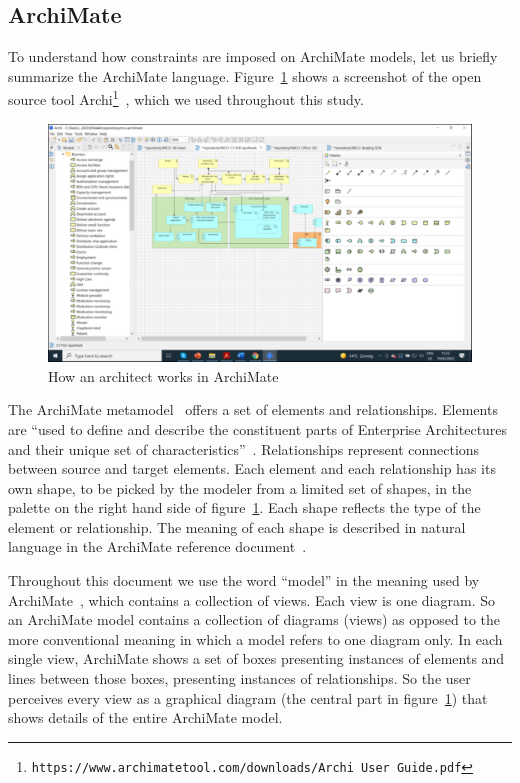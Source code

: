 \documentclass[sn-vancouver]{sn-jnl}%
\begin{document}
\subsection{ArchiMate}\label{ArchiMate}
To understand how constraints are imposed on ArchiMate models,
let us briefly summarize the ArchiMate language.
Figure~\ref{how} shows a screenshot of the open source tool Archi\footnote{\tt\tiny https://www.archimatetool.com/downloads/Archi User Guide.pdf}~\cite{Archi}, which we used throughout this study.

\begin{figure}[b]
 \centering
\includegraphics[clip=true, scale=0.5]{HowArchitectWorks}
\caption{How an architect works in ArchiMate}
\label{how}   %
\end{figure}

The ArchiMate metamodel~\cite{ArchiMateMetaModel} offers a set of elements and relationships.
Elements are ``used to define and describe the constituent parts of Enterprise Architectures and their unique set of characteristics''~\cite{ArchiMate}.
Relationships represent connections between source and target elements.
Each element and each relationship has its own shape, to be picked by the modeler from a limited set of shapes,
in the palette on the right hand side of figure~\ref{how}.
Each shape reflects the type of the element or relationship.
The meaning of each shape is described in natural language in the ArchiMate reference document~\cite{ArchiMate}.

Throughout this document we use the word ``model'' in the meaning used by ArchiMate~\cite{ArchiMate},
which contains a collection of views. Each view is one diagram.
So an ArchiMate model contains a collection of diagrams (views) as opposed to the more conventional meaning in which a model refers to one diagram only.
In each single view, ArchiMate shows a set of boxes presenting instances of elements and lines between those boxes, presenting instances of relationships.
So the user perceives every view as a graphical diagram (the central part in figure~\ref{how}) that shows details of the entire ArchiMate model.
\end{document}
